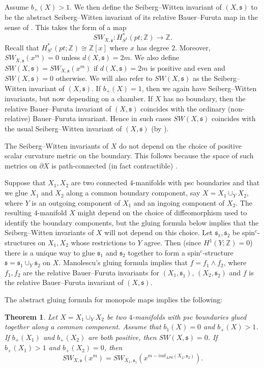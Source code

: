 \documentclass{amsart}
\newtheorem{theorem}{Theorem}[section]
\theoremstyle{definition}
\theoremstyle{remark}
\numberwithin{equation}{section}
\begin{document}
Assume $b_+(X)>1$. We then define the Seiberg--Witten invariant of $(X, \mathfrak{s})$ to be the abstract Seiberg--Witten invariant of its relative Bauer--Furuta map in the sense of \cite[Definition 2.3]{bar}. This takes the form of a map
\[
SW_{X , \mathfrak{s}} : H^*_{S^1}(pt ; \mathbb{Z}) \to \mathbb{Z}.
\]
Recall that $H^*_{S^1}(pt ; \mathbb{Z}) \cong \mathbb{Z}[x]$ where $x$ has degree $2$. Moreover, $SW_{X , \mathfrak{s}}( x^m ) = 0$ unless $d(X , \mathfrak{s}) = 2m$. We also define $SW(X,\mathfrak{s}) = SW_{X , \mathfrak{s}}( x^m)$ if $d(X,\mathfrak{s}) = 2m$ is positive and even and $SW(X ,\mathfrak{s}) = 0$ otherwise. We will also refer to $SW(X , \mathfrak{s})$ as the Seiberg--Witten invariant of $(X,\mathfrak{s})$. If $b_+(X) = 1$, then we again have Seiberg--Witten invariants, but now depending on a chamber. If $X$ has no boundary, then the relative Bauer--Furuta invariant of $(X , \mathfrak{s})$ coincides with the ordinary (non-relative) Bauer--Furuta invariant. Hence in such cases $SW(X,\mathfrak{s})$ coincides with the usual Seiberg--Witten invariant of $(X,\mathfrak{s})$ (by \cite[Theorem 2.24]{bako}).

The Seiberg--Witten invariants of $X$ do not depend on the choice of positive scalar curvature metric on the boundary. This follows because the space of such metrics on $\partial X$ is path-connected (in fact contractible) \cite[Theorem 1.1]{bakl}.

Suppose that $X_1,X_2$ are two connected $4$-manifolds with psc boundaries and that we glue $X_1$ and $X_2$ along a common boundary component, say $X = X_1 \cup_{Y} X_2$, where $Y$ is an outgoing component of $X_1$ and an ingoing component of $X_2$. The resulting $4$-manifold $X$ might depend on the choice of diffeomorphism used to identify the boundary components, but the gluing formula below implies that the Seiberg--Witten invariants of $X$ will not depend on this choice. Let $\mathfrak{s}_1, \mathfrak{s}_2$ be spin$^c$-structures on $X_1,X_2$ whose restrictions to $Y$ agree. Then (since $H^1(Y ; \mathbb{Z}) = 0$) there is a unique way to glue $\mathfrak{s}_1$ and $\mathfrak{s}_2$ together to form a spin$^c$-structure $\mathfrak{s} = \mathfrak{s}_1 \cup_Y \mathfrak{s}_2$ on $X$. Manolescu's gluing formula \cite{man2} implies that $f = f_1 \wedge f_2$, where $f_1,f_2$ are the relative Bauer--Furuta invariants for $(X_1 , \mathfrak{s}_1)$, $(X_2 , \mathfrak{s}_2)$ and $f$ is the relative Bauer--Furuta invariant of $(X , \mathfrak{s})$.

The abstract gluing formula for monopole maps \cite[Theorem 8.2]{bar} implies the following: 
\begin{theorem}\label{thm:pscglue}
Let $X = X_1 \cup_Y X_2$ be two $4$-manifolds with psc boundaries glued together along a common component. Assume that $b_1(X) = 0$ and $b_+(X) > 1$. If $b_+(X_1)$ and $b_+(X_2)$ are both positive, then $SW(X , \mathfrak{s}) = 0$. If $b_+(X_1) > 1$ and $b_+(X_2) = 0$, then
\[
SW_{X,\mathfrak{s}}( x^m ) = SW_{X_1 , \mathfrak{s}_1}( x^{m - ind_{APS}( X_2 , \mathfrak{s_2})} ).
\]
\end{theorem}
\end{document}
